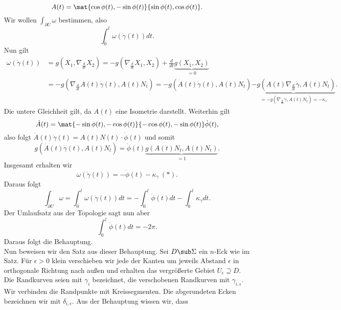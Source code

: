\begin{beweis}
\begin{equation}
A(t) = \mat{\cos \phi(t), -\sin \phi(t)}{\sin \phi(t), \cos \phi(t)}.
\end{equation}
Wir wollen $\int_{\partial U} \omega$ bestimmen, also 
\begin{equation}
\int_0^l \omega(\dot{\gamma}(t)) dt.
\end{equation}
Nun gilt
\begin{align}
\omega(\dot{\gamma}(t)) &= g(X_1, \nabla_\frac{d}{dt} X_2) = -g (\nabla_\frac{d}{dt} X_1, X_2) + \frac{d}{dt} \underbrace{g(X_1, X_2)}_{=0} \\
&= -g(\nabla_\frac{d}{dt} A(t) \dot{\gamma}(t), A(t) N_t) = -g (\dot{A}(t) \dot{\gamma}(t), A(t) N_t) \underbrace{- g(A(t) \nabla_\frac{d}{dt} \dot{\gamma}, A(t) N_t)}_{= -g(\nabla_\frac{d}{dt} \dot{\gamma}, A(t) N_t) = - \kappa_\gamma}.
\end{align}
Die untere Gleichheit gilt, da $A(t)$ eine Isometrie darstellt. Weiterhin gilt
\begin{equation}
\dot{A}(t) = \mat{-\sin \phi(t), - \cos \phi(t)}{- \cos \phi(t), -\sin \phi(t)} \dot{\phi} (t),
\end{equation}
also folgt $\dot{A}(t) \dot{\gamma} (t) = A(t)N(t)\cdot \dot{\phi} (t)$ und somit
\begin{equation}
g(\dot{A}(t) \dot{\gamma}(t), A(t)N_t) = \dot{\phi}(t) \underbrace{g(A(t)N_t, A(t)N_t)}_{=1}.
\end{equation}
Insgesamt erhalten wir
\begin{equation}
\omega(\dot{\gamma}(t)) = - \dot{\phi}(t) - \kappa_\gamma \ (\ast).
\end{equation}
Daraus folgt
\begin{equation}
\int_{\partial U} \omega = \int_0^l \omega(\dot{\gamma}(t)) dt = - \int_0^l \dot{\phi} (t) dt - \int_0^l \kappa_\gamma dt.
\end{equation}
Der Umlaufsatz aus der Topologie sagt nun aber
\begin{equation}
\int_0^l \dot{\phi} (t) dt = - 2 \pi.
\end{equation}
Daraus folgt die Behauptung.\\
Nun beweisen wir den Satz aus dieser Behauptung. Sei $D \sub \Sigma$ ein $n$-Eck wie im Satz. Für $\epsilon > 0$ klein verschieben wir jede der Kanten um jeweils Abstand $\epsilon$ in orthogonale Richtung nach außen und erhalten das vergrößerte Gebiet $U_\epsilon \supseteq D$. Die Randkurven seien mit $\gamma_i$ bezeichnet, die verschobenen Randkurven mit $\gamma_{i,\epsilon}$. Wir verbinden die Randpunkte mit Kreissegmenten. Die abgerundeten Ecken bezeichnen wir mit $\delta_{i, \epsilon}$. Aus der Behauptung wissen wir, dass

\end{beweis}
